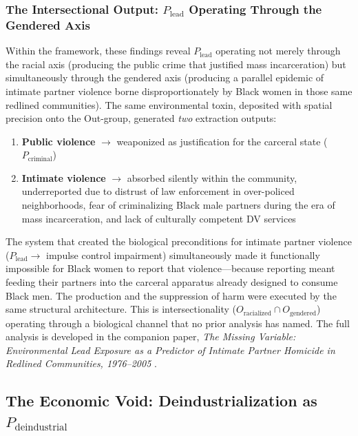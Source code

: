 \documentclass[12pt,openany]{book}
\begin{document}
\subsubsection{The Intersectional Output: \texorpdfstring{$P_{\text{lead}}$}{P\_lead} Operating Through the Gendered Axis}

Within the framework, these findings reveal $P_{\text{lead}}$ operating not merely through the racial axis (producing the public crime that justified mass incarceration) but simultaneously through the gendered axis (producing a parallel epidemic of intimate partner violence borne disproportionately by Black women in those same redlined communities). The same environmental toxin, deposited with spatial precision onto the Out-group, generated \textit{two} extraction outputs:

\begin{enumerate}[nosep]
    \item \textbf{Public violence} $\rightarrow$ weaponized as justification for the carceral state ($P_{\text{criminal}}$)
    \item \textbf{Intimate violence} $\rightarrow$ absorbed silently within the community, underreported due to distrust of law enforcement in over-policed neighborhoods, fear of criminalizing Black male partners during the era of mass incarceration, and lack of culturally competent DV services
\end{enumerate}

The system that created the biological preconditions for intimate partner violence ($P_{\text{lead}} \rightarrow$ impulse control impairment) simultaneously made it functionally impossible for Black women to report that violence---because reporting meant feeding their partners into the carceral apparatus already designed to consume Black men. The production and the suppression of harm were executed by the same structural architecture. This is intersectionality ($O_{\text{racialized}} \cap O_{\text{gendered}}$) operating through a biological channel that no prior analysis has named. The full analysis is developed in the companion paper, \textit{The Missing Variable: Environmental Lead Exposure as a Predictor of Intimate Partner Homicide in Redlined Communities, 1976--2005} \cite{theodore_missing_variable}.

\FloatBarrier

\subsection{The Economic Void: Deindustrialization as \texorpdfstring{$P_{\text{deindustrial}}$}{P\_deindustrial}}
\end{document}
